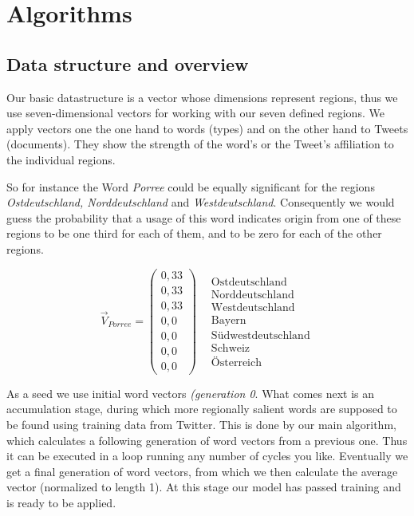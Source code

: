 \documentclass[../Main.tex]{subfiles}
\begin{document}
\section{Algorithms}
\subsection{Data structure and overview}
Our basic datastructure is a vector whose dimensions represent regions, thus we use seven-dimensional vectors for working with our seven defined regions.
We apply vectors one the one hand to words (types) and on the other hand to Tweets (documents). They show the strength of the word's or the Tweet's affiliation to the individual regions.

So for instance the Word \textit{Porree} could be equally significant for the regions \textit{Ostdeutschland, Norddeutschland} and \textit{Westdeutschland}. Consequently we would guess the probability that a usage of this word indicates origin from one of these regions to be one third for each of them, and to be zero for each of the other regions.

$$\vec V_{Porree} = \begin{pmatrix} 0,33 \\ 0,33 \\ 0,33 \\ 0,0 \\ 0,0 \\ 0,0 \\ 0,0 \end{pmatrix} \ \ \ \ \begin{matrix} \text{Ostdeutschland} \\ \text{Norddeutschland} \\ \text{Westdeutschland} \\ \text{Bayern} \\ \text{Südwestdeutschland} \\ \text{Schweiz} \\ \text{Österreich} \end{matrix}$$

As a seed we use initial word vectors \textit{(generation 0}. What comes next is an accumulation stage, during which more regionally salient words are supposed to be found using training data from Twitter. This is done by our main algorithm, which calculates a following generation of word vectors from a previous one. Thus it can be executed in a loop running any number of cycles you like. Eventually we get a final generation of word vectors, from which we then calculate the average vector (normalized to length 1). At this stage our model has passed training and is ready to be applied.
\end{document}
